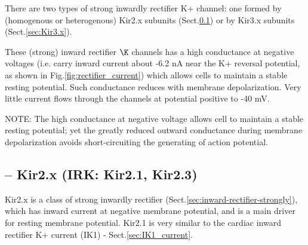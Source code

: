 There are two types of strong inwardly rectifier K+ channel: one  formed
by (homogenous or heterogenous) Kir2.x subunits (Sect.\ref{sec:Kir2.x}) or
by Kir3.x subunits (Sect.\ref{sec:Kir3.x}).

These (strong) inward rectifier $\K$ channels has a high conductance at negative
voltages (i.e. carry inward current about -6.2 nA near the K+ reversal
potential, as shown in Fig.\ref{fig:rectifier_current}) which allows cells to
maintain a stable resting potential. Such conductance reduces with membrane
depolarization. Very little current flows through the
channels at potential positive to -40 mV.

NOTE: The high conductance at negative  voltage allows cell to maintain a
stable resting potential; yet the greatly reduced outward conductance during
membrane depolarization avoids short-circuiting the generating of action
potential.


\subsection{-- Kir2.x (IRK: Kir2.1, Kir2.3)}
\label{sec:Kir2.x}
\label{sec:Kir2.0}

Kir2.x is a class of strong inwardly rectifier
(Sect.\ref{sec:inward-rectifier-strongly}), which has inward current at
negative membrane potential, and is a main driver for resting membrane
potential. Kir2.1 is very similar to the cardiac inward rectifier K+ current
(IK1) - Sect.\ref{sec:IK1_current}.


